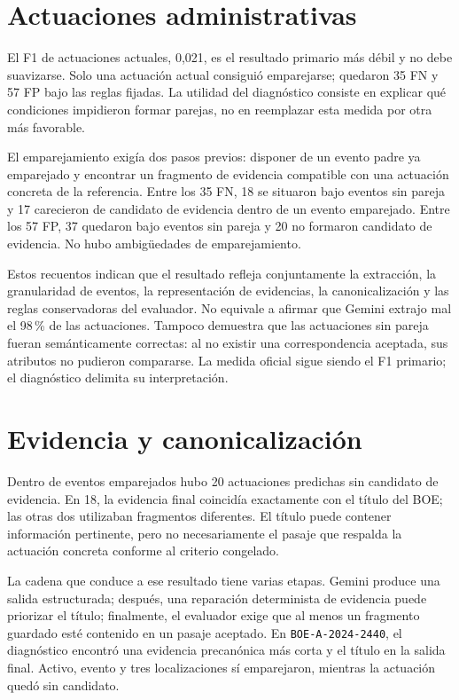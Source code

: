 \section{Actuaciones administrativas}
El F1 de actuaciones actuales, 0,021, es el resultado primario más débil y no
debe suavizarse. Solo una actuación actual consiguió emparejarse; quedaron 35
FN y 57 FP bajo las reglas fijadas. La utilidad del diagnóstico consiste en
explicar qué condiciones impidieron formar parejas, no en reemplazar esta
medida por otra más favorable.

El emparejamiento exigía dos pasos previos: disponer de un evento padre ya
emparejado y encontrar un fragmento de evidencia compatible con una actuación
concreta de la referencia. Entre los 35 FN, 18 se situaron bajo eventos sin
pareja y 17 carecieron de candidato de evidencia dentro de un evento
emparejado. Entre los 57 FP, 37 quedaron bajo eventos sin pareja y 20 no
formaron candidato de evidencia. No hubo ambigüedades de emparejamiento.

Estos recuentos indican que el resultado refleja conjuntamente la extracción,
la granularidad de eventos, la representación de evidencias, la
canonicalización y las reglas conservadoras del evaluador. No equivale a
afirmar que Gemini extrajo mal el 98\,\% de las actuaciones. Tampoco demuestra
que las actuaciones sin pareja fueran semánticamente correctas: al no existir
una correspondencia aceptada, sus atributos no pudieron compararse. La medida
oficial sigue siendo el F1 primario; el diagnóstico delimita su interpretación.

\section{Evidencia y canonicalización}
Dentro de eventos emparejados hubo 20 actuaciones predichas sin candidato de
evidencia. En 18, la evidencia final coincidía exactamente con el título del
BOE; las otras dos utilizaban fragmentos diferentes. El título puede contener
información pertinente, pero no necesariamente el pasaje que respalda la
actuación concreta conforme al criterio congelado.

La cadena que conduce a ese resultado tiene varias etapas. Gemini produce una
salida estructurada; después, una reparación determinista de evidencia puede
priorizar el título; finalmente, el evaluador exige que al menos un fragmento
guardado esté contenido en un pasaje aceptado. En
\texttt{BOE-A-2024-2440}, el diagnóstico encontró una evidencia precanónica
más corta y el título en la salida final. Activo, evento y tres localizaciones
sí emparejaron, mientras la actuación quedó sin candidato.


